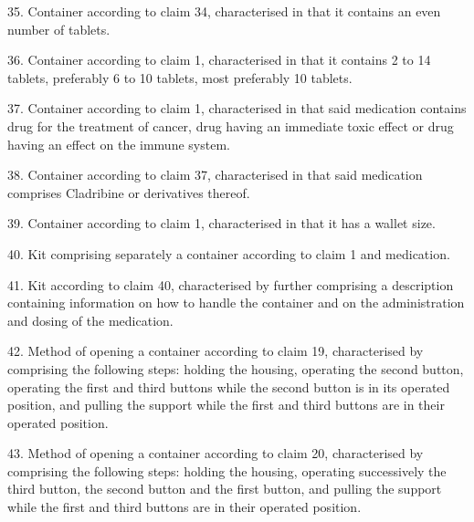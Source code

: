 \documentclass[11pt,a4paper]{article}
\begin{document}
35. Container according to claim 34, characterised in that it contains an even number of tablets.

36. Container according to claim 1, characterised in that it contains 2 to 14 tablets, preferably 6 to 10 tablets, most preferably 10 tablets.

37. Container according to claim 1, characterised in that said medication contains drug for the treatment of cancer, drug having an immediate toxic effect or drug having an effect on the immune system.

38. Container according to claim 37, characterised in that said medication comprises Cladribine or derivatives thereof.

39. Container according to claim 1, characterised in that it has a wallet size.

40. Kit comprising separately a container according to claim 1 and medication.

41. Kit according to claim 40, characterised by further comprising a description containing information on how to handle the container and on the administration and dosing of the medication.

42. Method of opening a container according to claim 19, characterised by comprising the following steps: holding the housing, operating the second button, operating the first and third buttons while the second button is in its operated position, and pulling the support while the first and third buttons are in their operated position.

43. Method of opening a container according to claim 20, characterised by comprising the following steps: holding the housing, operating successively the third button, the second button and the first button, and pulling the support while the first and third buttons are in their operated position.
\end{document}
